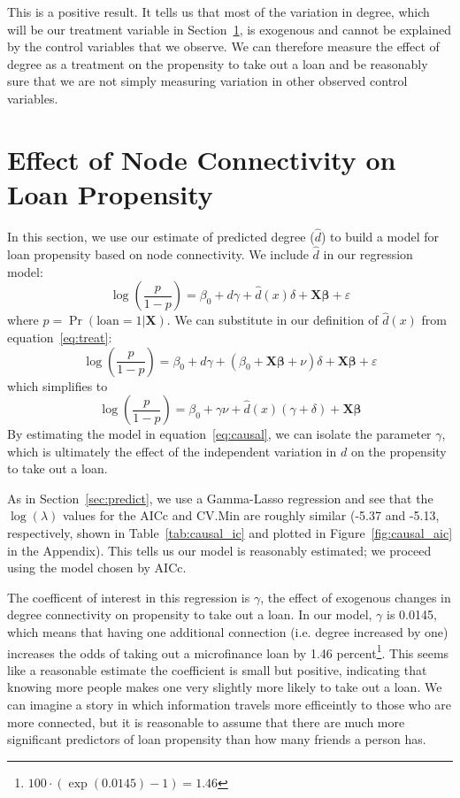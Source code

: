 \documentclass[11pt, fleqn]{article}
\begin{document}
This is a positive result. It tells us that most of the variation in degree, which will be our treatment variable in Section~\ref{sec:model}, is exogenous and cannot be explained by the control variables that we observe. We can therefore measure the effect of degree as a treatment on the propensity to take out a loan and be reasonably sure that we are not simply measuring variation in other observed control variables.

\section{Effect of Node Connectivity on Loan Propensity}
\label{sec:model}

In this section, we use our estimate of predicted degree ($\hat{d}$) to build a model for loan propensity based on node connectivity. We include $\hat{d}$ in our regression model:
\begin{equation} \label{eq:causal}
\log\left(\frac{p}{1-p}\right) = \beta_0 + d \gamma + \hat{d}(x) \delta + \bm{X}\bm{\beta} + \varepsilon
\end{equation}
where $p = \Pr(\text{loan}=1|\bm{X})$. We can substitute in our definition of $\hat{d}(x)$ from equation~\ref{eq:treat}:
\begin{equation}
\log\left(\frac{p}{1-p}\right) = \beta_0 + d \gamma + \left(\beta_0 + \bm{X} \bm{\beta} + \nu\right) \delta + \bm{X}\bm{\beta} + \varepsilon
\end{equation}
which simplifies to
\begin{equation}
\log\left(\frac{p}{1-p}\right) = \beta_0 + \gamma \nu + \hat{d}(x) (\gamma + \delta) + \bm{X}\bm{\beta}
\end{equation}
By estimating the model in equation~\ref{eq:causal}, we can isolate the parameter $\gamma$, which is ultimately the effect of the independent variation in $d$ on the propensity to take out a loan. 

As in Section~\ref{sec:predict}, we use a Gamma-Lasso regression and see that the $\log(\lambda)$ values for the AICc and CV.Min are roughly similar (-5.37 and -5.13, respectively, shown in Table~\ref{tab:causal_ic} and plotted in Figure~\ref{fig:causal_aic} in the Appendix). This tells us our model is reasonably estimated; we proceed using the model chosen by AICc.

The coefficent of interest in this regression is $\gamma$, the effect of exogenous changes in degree connectivity on propensity to take out a loan. In our model, $\gamma$ is 0.0145, which means that having one additional connection (i.e. degree increased by one) increases the odds of taking out a microfinance loan by 1.46 percent\footnote{$100 \cdot \left( \exp(0.0145) - 1 \right) = 1.46$}. This seems like a reasonable estimate \textemdash the coefficient is small but positive, indicating that knowing more people makes one very slightly more likely to take out a loan. We can imagine a story in which information travels more efficeintly to those who are more connected, but it is reasonable to assume that there are much more significant predictors of loan propensity than how many friends a person has.
\end{document}
